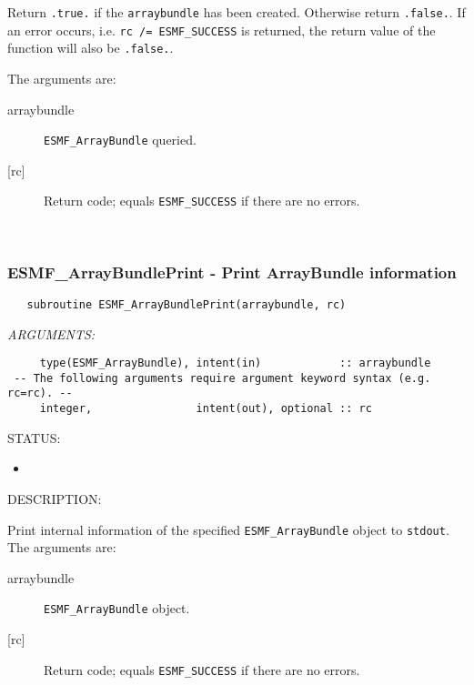      Return {\tt .true.} if the {\tt arraybundle} has been created. Otherwise return 
     {\tt .false.}. If an error occurs, i.e. {\tt rc /= ESMF\_SUCCESS} is 
     returned, the return value of the function will also be {\tt .false.}.
  
   The arguments are:
     \begin{description}
     \item[arraybundle]
       {\tt ESMF\_ArrayBundle} queried.
     \item[{[rc]}]
       Return code; equals {\tt ESMF\_SUCCESS} if there are no errors.
     \end{description}
   
 
\mbox{}\hrulefill\ 
 
\subsubsection [ESMF\_ArrayBundlePrint] {ESMF\_ArrayBundlePrint - Print ArrayBundle information}


 
\begin{verbatim}   subroutine ESMF_ArrayBundlePrint(arraybundle, rc)\end{verbatim}{\em ARGUMENTS:}
\begin{verbatim}     type(ESMF_ArrayBundle), intent(in)            :: arraybundle
 -- The following arguments require argument keyword syntax (e.g. rc=rc). --
     integer,                intent(out), optional :: rc  \end{verbatim}
{\sf STATUS:}
   \begin{itemize}
   \item{}
   \end{itemize}
  
{\sf DESCRIPTION:\\ }


     Print internal information of the specified {\tt ESMF\_ArrayBundle}
     object to {\tt stdout}. \\
  
     The arguments are:
     \begin{description}
     \item[arraybundle] 
       {\tt ESMF\_ArrayBundle} object.
     \item[{[rc]}] 
       Return code; equals {\tt ESMF\_SUCCESS} if there are no errors.
     \end{description}
   
